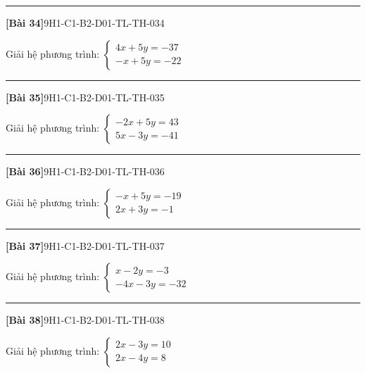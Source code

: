 \documentclass[12pt,a4paper]{article}
\newif\ifloigiai
\newenvironment{cauhoi}[2]{%
  \par\medskip\noindent\rule{\textwidth}{0.4pt}\par\nopagebreak
  \noindent\textbf{[#1]}\hfill{\scriptsize\ttfamily #2}\par\nopagebreak\smallskip}{\par}
\newcommand{\loigiai}[1]{\ifloigiai\par\smallskip\noindent\textit{Lời giải.} #1\par\fi}
\begin{document}
\begin{cauhoi}{Bài 34}{9H1-C1-B2-D01-TL-TH-034}
Giải hệ phương trình: $\begin{cases}4x + 5y=-37\\ -x + 5y=-22\end{cases}$
\loigiai{Nhân hai vế của phương trình thứ nhất với $1$ và phương trình thứ hai với $-1$ rồi cộng từng vế để khử $y$: $5x=-15$, suy ra $x=-3$. Thay $x=-3$ vào phương trình thứ nhất: $4\cdot(-3)+5y=-37$, suy ra $y=-5$. Vậy hệ có nghiệm $(x;y)=(-3;-5)$.}
\end{cauhoi}
\begin{cauhoi}{Bài 35}{9H1-C1-B2-D01-TL-TH-035}
Giải hệ phương trình: $\begin{cases}-2x + 5y=43\\ 5x - 3y=-41\end{cases}$
\loigiai{Nhân hai vế của phương trình thứ nhất với $-3$ và phương trình thứ hai với $-5$ rồi cộng từng vế để khử $y$: $-19x=76$, suy ra $x=-4$. Thay $x=-4$ vào phương trình thứ nhất: $-2\cdot(-4)+5y=43$, suy ra $y=7$. Vậy hệ có nghiệm $(x;y)=(-4;7)$.}
\end{cauhoi}
\begin{cauhoi}{Bài 36}{9H1-C1-B2-D01-TL-TH-036}
Giải hệ phương trình: $\begin{cases}-x + 5y=-19\\ 2x + 3y=-1\end{cases}$
\loigiai{Nhân hai vế của phương trình thứ nhất với $3$ và phương trình thứ hai với $-5$ rồi cộng từng vế để khử $y$: $-13x=-52$, suy ra $x=4$. Thay $x=4$ vào phương trình thứ nhất: $-1\cdot(4)+5y=-19$, suy ra $y=-3$. Vậy hệ có nghiệm $(x;y)=(4;-3)$.}
\end{cauhoi}
\begin{cauhoi}{Bài 37}{9H1-C1-B2-D01-TL-TH-037}
Giải hệ phương trình: $\begin{cases}x - 2y=-3\\ -4x - 3y=-32\end{cases}$
\loigiai{Nhân hai vế của phương trình thứ nhất với $-3$ và phương trình thứ hai với $2$ rồi cộng từng vế để khử $y$: $-11x=-55$, suy ra $x=5$. Thay $x=5$ vào phương trình thứ nhất: $1\cdot(5)-2y=-3$, suy ra $y=4$. Vậy hệ có nghiệm $(x;y)=(5;4)$.}
\end{cauhoi}
\begin{cauhoi}{Bài 38}{9H1-C1-B2-D01-TL-TH-038}
Giải hệ phương trình: $\begin{cases}2x - 3y=10\\ 2x - 4y=8\end{cases}$
\loigiai{Nhân hai vế của phương trình thứ nhất với $-4$ và phương trình thứ hai với $3$ rồi cộng từng vế để khử $y$: $-2x=-16$, suy ra $x=8$. Thay $x=8$ vào phương trình thứ nhất: $2\cdot(8)-3y=10$, suy ra $y=2$. Vậy hệ có nghiệm $(x;y)=(8;2)$.}
\end{cauhoi}
\end{document}
